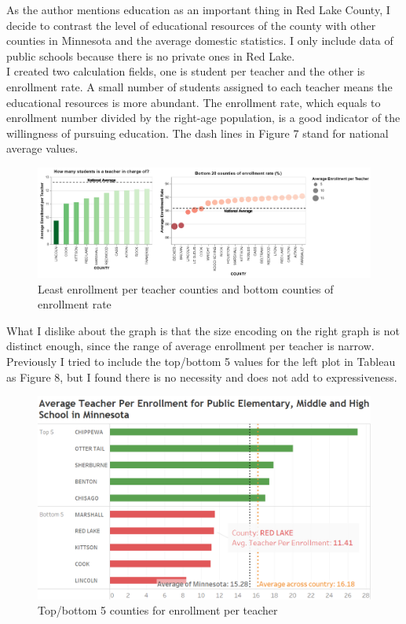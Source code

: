 \documentclass{article}
\begin{document}
As the author mentions education as an important thing in Red Lake County, I decide to contrast the level of educational resources of the county with other counties in Minnesota and the average domestic statistics. I only include data of public schools because there is no private ones in Red Lake. \\
\noindent
I created two calculation fields, one is student per teacher and the other is enrollment rate. A small number of students assigned to each teacher means the educational resources is more abundant. The enrollment rate, which equals to enrollment number divided by the right-age population, is a good indicator of the willingness of pursuing education. The dash lines in Figure 7 stand for national average values. \\
\begin{figure}[htbp]
    \centering
    \includegraphics[scale=0.3]{EDU.png}
    \caption{Least enrollment per teacher counties and bottom counties of enrollment rate}
\end{figure}
\newpage
\noindent
What I dislike about the graph is that the size encoding on the right graph is not distinct enough, since the range of average enrollment per teacher is narrow. \\
\noindent
Previously I tried to include the top/bottom 5 values for the left plot in Tableau as Figure 8, but I found there is no necessity and does not add to expressiveness. \\
\begin{figure}[htbp]
    \centering
    \includegraphics[scale=0.5]{EDU_att.png}
    \caption{Top/bottom 5 counties for enrollment per teacher }
\end{figure}
\end{document}
